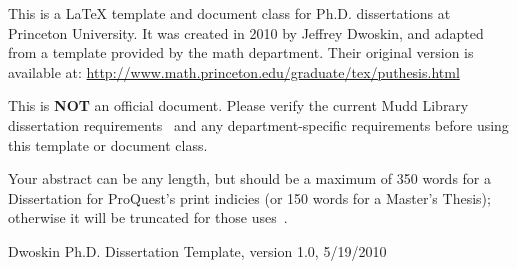 This is a \LaTeX{} template and document class for Ph.D. dissertations at Princeton University. It was created in 2010 by Jeffrey Dwoskin, and adapted from a template provided by the math department. Their original version is available at: \url{http://www.math.princeton.edu/graduate/tex/puthesis.html}

This is \textbf{NOT} an official document. Please verify the current Mudd Library dissertation requirements~\cite{mudd2009} and any department-specific requirements before using this template or document class.


Your abstract can be any length, but should be a maximum of 350 words for a Dissertation for ProQuest's print indicies (or 150 words for a Master's Thesis); otherwise it will be truncated for those uses~\cite{proquest2006}.


Dwoskin Ph.D. Dissertation Template, version 1.0, 5/19/2010
